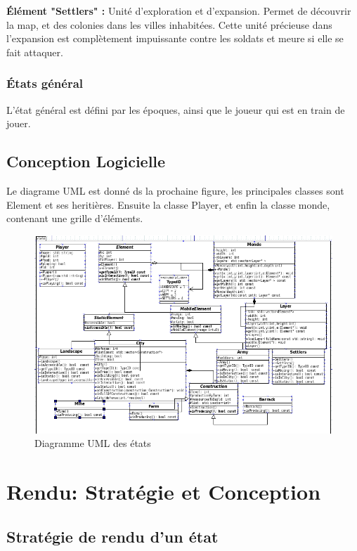 \documentclass[a4paper,12pt]{article}
\begin{document}
\textbf{Élément "Settlers" :} Unité d'exploration et d'expansion. Permet de découvrir la map, et des colonies dans les villes inhabitées. Cette unité précieuse dans l'expansion est complètement impuissante contre les soldats et meure si elle se fait attaquer.

\subsubsection{États général}

L'état général est défini par les époques, ainsi que le joueur qui est en train de jouer.


\subsection{Conception Logicielle}

Le diagrame UML est donné ds la prochaine figure, les principales classes sont Element et ses heritières.
Ensuite la classe Player, et enfin la classe monde, contenant une grille d'éléments.

\begin{figure}[H]
\begin{center}
  \includegraphics[width=1\textwidth]{images/stateUML.png}
  \caption{Diagramme UML des états}
 \end{center}

\end{figure}
\clearpage
\section{Rendu: Stratégie et Conception}

\subsection{Stratégie de rendu d'un état}
\end{document}

